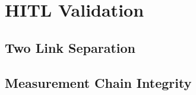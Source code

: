 \section{HITL Validation}

\subsection{Two Link Separation}


\subsection{Measurement Chain Integrity}